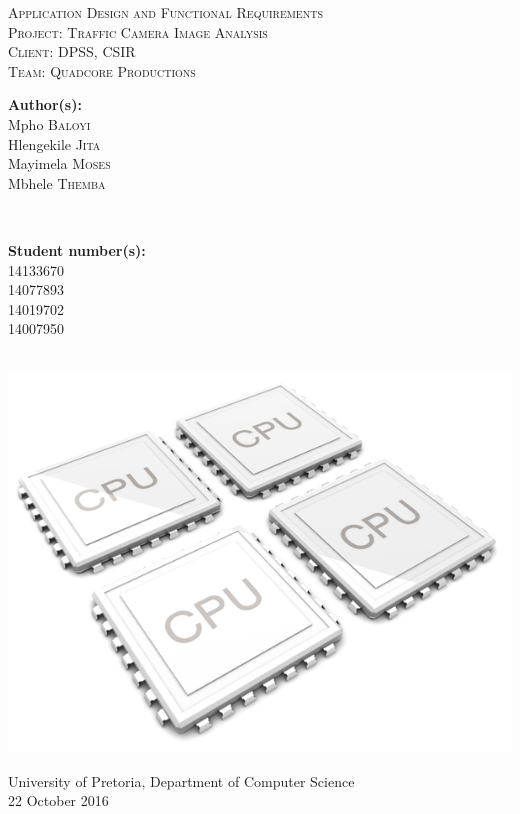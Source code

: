 \documentclass[a4paper,12pt]{article}
\begin{document}
\begin{titlepage}
\center

\textsc{\LARGE Application Design and Functional Requirements}\\[1.5cm]
\textsc{\Large Project: Traffic Camera Image Analysis}\\[1.5cm]
\textsc{\large Client: DPSS, CSIR}\\[0.5cm]
\textsc{\large Team: Quadcore Productions}\\[0.5cm]

\begin{minipage}{0.4\textwidth}
\begin{flushleft} \large
\textbf{Author(s):}\\
Mpho \textsc{Baloyi}\\
Hlengekile \textsc{Jita}\\
Mayimela \textsc{Moses}\\
Mbhele \textsc{Themba}\\
\end{flushleft}
\end{minipage}
~
\begin{minipage}{0.4\textwidth}
\begin{flushright} \large
\textbf{Student number(s):} \\
14133670\\ %
14077893\\
14019702\\
14007950\\
\end{flushright}
\end{minipage}\\

\includegraphics[width=\textwidth]{2012-quad-core-phones.jpg}

{\large University of Pretoria, Department of Computer Science}\\

{\large 22 October 2016}\\[3cm]

\vfil

\end{titlepage}
\end{document}
